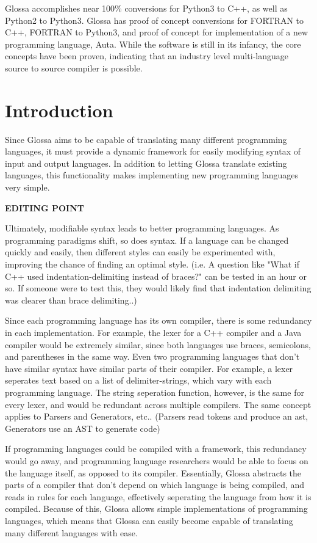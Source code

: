 \documentclass{article}
\begin{document}
Glossa accomplishes near 100\% conversions for Python3 to C++, as well as Python2 to Python3.
Glossa has proof of concept conversions for FORTRAN to C++, FORTRAN to Python3, and proof of concept for implementation of a new programming language, Auta.
While the software is still in its infancy, the core concepts have been proven, indicating that an industry level multi-language source to source compiler is possible.

\section{Introduction}

Since Glossa aims to be capable of translating many different programming languages, it must provide a dynamic framework for easily modifying syntax of input and output languages. 
In addition to letting Glossa translate existing languages, this functionality makes implementing new programming languages very simple.

\textbf{EDITING POINT}

Ultimately, modifiable syntax leads to better programming languages.
As programming paradigms shift, so does syntax. 
If a language can be changed quickly and easily, then different styles can easily be experimented with, improving the chance of finding an optimal style.
(i.e. A question like "What if C++ used indentation-delimiting instead of braces?" can be tested in an hour or so. If someone were to test this, they would likely find that indentation delimiting was clearer than brace delimiting..)

Since each programming language has its own compiler, there is some redundancy in each implementation. 
For example, the lexer for a C++ compiler and a Java compiler would be extremely similar, since both languages use braces, semicolons, and parentheses in the same way.
Even two programming languages that don't have similar syntax have similar parts of their compiler. 
For example, a lexer seperates text based on a list of delimiter-strings, which vary with each programming language. The string seperation function, however, is the same for every lexer, and would be redundant across multiple compilers.
The same concept applies to Parsers and Generators, etc.. (Parsers read tokens and produce an ast, Generators use an AST to generate code)

If programming languages could be compiled with a framework, this redundancy would go away, and programming language researchers would be able to focus on the language itself, as opposed to its compiler.
Essentially, Glossa abstracts the parts of a compiler that don't depend on which language is being compiled, and reads in rules for each language, effectively seperating the language from how it is compiled. 
Because of this, Glossa allows simple implementations of programming languages, which means that Glossa can easily become capable of translating many different languages with ease.
\end{document}
